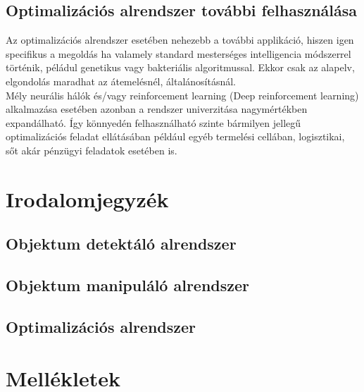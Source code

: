 \documentclass{article}
\begin{document}
\subsection{Optimalizációs alrendszer további felhasználása}
Az optimalizációs alrendszer esetében nehezebb a további applikáció, hiszen igen specifikus a megoldás ha valamely standard mesterséges intelligencia módszerrel történik, péládul genetikus vagy bakteriális algoritmussal. Ekkor csak az alapelv, elgondolás maradhat az átemelésnél, általánosításnál.\\
Mély neurális hálók és/vagy reinforcement learning (Deep reinforcement learning) alkalmazása esetében azonban a rendszer univerzitása nagymértékben expandálható.
Így könnyedén felhasználható szinte bármilyen jellegű optimalizációs feladat ellátásában például egyéb termelési cellában, logisztikai, sőt akár pénzügyi feladatok esetében is.


\section{Irodalomjegyzék}
\subsection{Objektum detektáló alrendszer}

\subsection{Objektum manipuláló alrendszer}

\subsection{Optimalizációs alrendszer}


\newpage
\section{Mellékletek}
\end{document}
